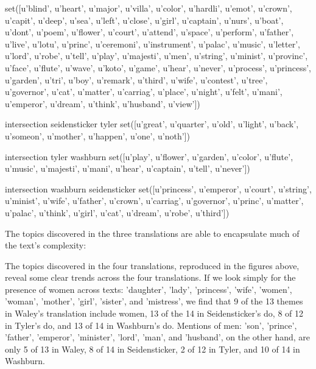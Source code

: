 \documentclass[12pt]{article}
\begin{document}
\begin{flushleft}
\begin{spacing}{2.0}
set([u'blind', u'heart', u'major', u'villa', u'color', u'hardli', u'emot', u'crown', u'capit', u'deep', u'sea', u'left', u'close', u'girl', u'captain', u'nurs', u'boat', u'dont', u'poem', u'flower', u'court', u'attend', u'space', u'perform', u'father', u'live', u'lotu', u'princ', u'ceremoni', u'instrument', u'palac', u'music', u'letter', u'lord', u'robe', u'tell', u'play', u'majesti', u'men', u'string', u'minist', u'provinc', u'face', u'flute', u'wave', u'koto', u'game', u'hear', u'never', u'process', u'princess', u'garden', u'tri', u'boy', u'remark', u'third', u'wife', u'contest', u'tree', u'governor', u'cat', u'matter', u'carriag', u'place', u'night', u'felt', u'mani', u'emperor', u'dream', u'think', u'husband', u'view'])

intersection seidensticker tyler
set([u'great', u'quarter', u'old', u'light', u'back', u'someon', u'mother', u'happen', u'one', u'noth'])

intersection tyler washburn
set([u'play', u'flower', u'garden', u'color', u'flute', u'music', u'majesti', u'mani', u'hear', u'captain', u'tell', u'never'])

intersection washburn seidensticker
set([u'princess', u'emperor', u'court', u'string', u'minist', u'wife', u'father', u'crown', u'carriag', u'governor', u'princ', u'matter', u'palac', u'think', u'girl', u'cat', u'dream', u'robe', u'third'])


The topics discovered in the three translations are able to encapsulate much of the text's complexity: 

The topics discovered in the four translations, reproduced in the figures above, reveal some clear trends across the four translations. If we look simply for the presence of women across texts: 'daughter', 'lady', 'princess', 'wife', 'women', 'woman', 'mother', 'girl', 'sister', and 'mistress', we find that 9 of the 13 themes in Waley's translation include women, 13 of the 14 in Seidensticker's do, 8 of 12 in Tyler's do, and 13 of 14 in Washburn's do. Mentions of men: 'son', 'prince', 'father', 'emperor', 'minister', 'lord', 'man', and 'husband', on the other hand, are only 5 of 13 in Waley, 8 of 14 in Seidensticker, 2 of 12 in Tyler, and 10 of 14 in Washburn. 


\end{spacing}
\end{flushleft}
\end{document}
